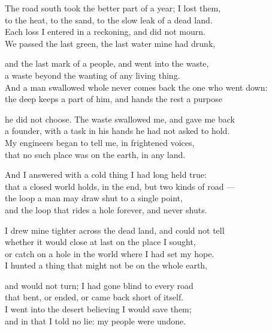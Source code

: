 \begin{founder}
The road south took the better part of a year; I lost them,\\
to the heat, to the sand, to the slow leak of a dead land.\\
Each loss I entered in a reckoning, and did not mourn.\\
We passed the last green, the last water mine had drunk,\\
\medskip

and the last mark of a people, and went into the waste,\\
a waste beyond the wanting of any living thing.\\
And a man swallowed whole never comes back the one who went down:\\
the deep keeps a part of him, and hands the rest a purpose\\
\medskip

he did not choose. The waste swallowed me, and gave me back\\
a founder, with a task in his hands he had not asked to hold.\\
My engineers began to tell me, in frightened voices,\\
that no such place was on the earth, in any land.\\
\medskip

And I answered with a cold thing I had long held true:\\
that a closed world holds, in the end, but two kinds of road ---\\
the loop a man may draw shut to a single point,\\
and the loop that rides a hole forever, and never shuts.\\
\medskip

I drew mine tighter across the dead land, and could not tell\\
whether it would close at last on the place I sought,\\
or catch on a hole in the world where I had set my hope.\\
I hunted a thing that might not be on the whole earth,\\
\medskip

and would not turn; I had gone blind to every road\\
that bent, or ended, or came back short of itself.\\
I went into the desert believing I would save them;\\
and in that I told no lie: my people were undone.\\
\medskip


\end{founder}
